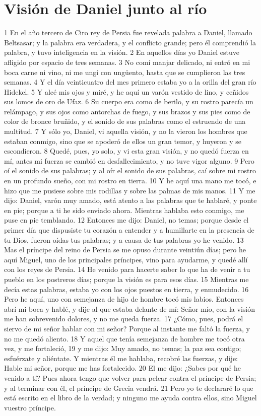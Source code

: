 \section*{Visión de Daniel junto al río}

1 En el año tercero de Ciro rey de Persia fue revelada palabra a Daniel, llamado Beltsasar; y la palabra era verdadera, y el conflicto grande; pero él comprendió la palabra, y tuvo inteligencia en la visión.
2 En aquellos días yo Daniel estuve afligido por espacio de tres semanas.
3 No comí manjar delicado, ni entró en mi boca carne ni vino, ni me ungí con ungüento, hasta que se cumplieron las tres semanas.
4 Y el día veinticuatro del mes primero estaba yo a la orilla del gran río Hidekel.
5 Y alcé mis ojos y miré, y he aquí un varón vestido de lino, y ceñidos sus lomos de oro de Ufaz.
6 Su cuerpo era como de berilo, y su rostro parecía un relámpago, y sus ojos como antorchas de fuego, y sus brazos y sus pies como de color de bronce bruñido, y el sonido de sus palabras como el estruendo de una multitud.
7 Y sólo yo, Daniel, vi aquella visión, y no la vieron los hombres que estaban conmigo, sino que se apoderó de ellos un gran temor, y huyeron y se escondieron.
8 Quedé, pues, yo solo, y vi esta gran visión, y no quedó fuerza en mí, antes mi fuerza se cambió en desfallecimiento, y no tuve vigor alguno.
9 Pero oí el sonido de sus palabras; y al oír el sonido de sus palabras, caí sobre mi rostro en un profundo sueño, con mi rostro en tierra.
10 Y he aquí una mano me tocó, e hizo que me pusiese sobre mis rodillas y sobre las palmas de mis manos.
11 Y me dijo: Daniel, varón muy amado, está atento a las palabras que te hablaré, y ponte en pie; porque a ti he sido enviado ahora. Mientras hablaba esto conmigo, me puse en pie temblando.
12 Entonces me dijo: Daniel, no temas; porque desde el primer día que dispusiste tu corazón a entender y a humillarte en la presencia de tu Dios, fueron oídas tus palabras; y a causa de tus palabras yo he venido.
13 Mas el príncipe del reino de Persia se me opuso durante veintiún días; pero he aquí Miguel, uno de los principales príncipes, vino para ayudarme, y quedé allí con los reyes de Persia.
14 He venido para hacerte saber lo que ha de venir a tu pueblo en los postreros días; porque la visión es para esos días.
15 Mientras me decía estas palabras, estaba yo con los ojos puestos en tierra, y enmudecido.
16 Pero he aquí, uno con semejanza de hijo de hombre tocó mis labios. Entonces abrí mi boca y hablé, y dije al que estaba delante de mí: Señor mío, con la visión me han sobrevenido dolores, y no me queda fuerza.
17 ¿Cómo, pues, podrá el siervo de mi señor hablar con mi señor? Porque al instante me faltó la fuerza, y no me quedó aliento.
18 Y aquel que tenía semejanza de hombre me tocó otra vez, y me fortaleció,
19 y me dijo: Muy amado, no temas; la paz sea contigo; esfuérzate y aliéntate. Y mientras él me hablaba, recobré las fuerzas, y dije: Hable mi señor, porque me has fortalecido.
20 El me dijo: ¿Sabes por qué he venido a tí? Pues ahora tengo que volver para pelear contra el príncipe de Persia; y al terminar con él, el príncipe de Grecia vendrá.
21 Pero yo te declararé lo que está escrito en el libro de la verdad; y ninguno me ayuda contra ellos, sino Miguel vuestro príncipe.

